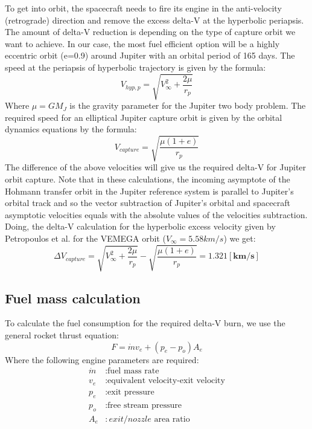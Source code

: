 To get into orbit, the spacecraft needs to fire its engine in the anti-velocity (retrograde) direction and remove the excess delta-V at the hyperbolic periapsis. The amount of delta-V reduction is depending on the type of capture orbit we want to achieve. In our case, the most fuel efficient option will be a highly eccentric orbit (e=0.9) around Jupiter with an orbital period of 165 days. The speed at the periapsis of hyperbolic trajectory is given by the formula:
\begin{equation}
V_{hyp,p}=\sqrt{V_{\infty}^{2}+\frac{2\mu}{r_p}}
\end{equation}
Where $\mu=GM_J$ is the gravity parameter for the Jupiter two body problem. The required speed for an elliptical Jupiter capture orbit is given by the orbital dynamics equations by the formula:
\begin{equation}
V_{capture}=\sqrt{\frac{\mu\left(1+e\right)}{r_p}}
\end{equation}
The difference of the above velocities will give us the required delta-V for Jupiter orbit capture. Note that in these calculations, the incoming asymptote of the Hohmann transfer orbit in the Jupiter reference system is parallel to Jupiter’s orbital track and so the vector subtraction of Jupiter’s orbital and spacecraft asymptotic velocities equals with the absolute values of the velocities subtraction.  Doing, the delta-V calculation for the hyperbolic excess velocity given by Petropoulos et al. for the VEMEGA orbit
($V_\infty=5.58km/s$) we get:
\begin{equation}
\Delta V_{capture}=\sqrt{V_{\infty}^{2}+\frac{2\mu}{r_p}}-\sqrt{\frac{\mu\left(1+e\right)}{r_p}} = \mathbf{1.321 [km/s]}
\end{equation}
\subsection*{Fuel mass calculation}
To calculate the fuel consumption for the required delta-V burn, we use the general rocket thrust equation:
\begin{equation}
F = \dot{m}v_e+(p_e-p_o)A_e
\end{equation}
Where the following engine parameters are required:
\begin{equation}
\begin{split}
\dot{m}&:\text{fuel mass rate}\\
v_e&:\text{equivalent velocity-exit velocity}\\
p_e&:\text{exit pressure}\\
p_o&:\text{free stream pressure}\\
A_e&:exit/nozzle \text{ area ratio}\\
\end{split}
\end{equation}

